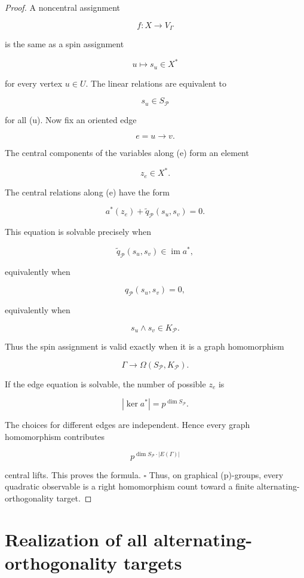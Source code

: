 \documentclass[11pt]{article}
\begin{document}
\begin{proof}
A noncentral assignment

\[
f:X\to V_\Gamma
\]

is the same as a spin assignment

\[
u\mapsto s_u\in X^*
\]

for every vertex $u\in U$. The linear relations are equivalent to

\[
s_u\in S_\mathcal P
\]

for all (u). Now fix an oriented edge

\[
e=u\to v.
\]

The central components of the variables along (e) form an element

\[
z_e\in X^*.
\]

The central relations along (e) have the form

\[
a^*(z_e)+\widetilde q_\mathcal P(s_u,s_v)=0.
\]

This equation is solvable precisely when

\[
\widetilde q_\mathcal P(s_u,s_v)\in\operatorname{im}a^*,
\]

equivalently when

\[
q_\mathcal P(s_u,s_v)=0,
\]

equivalently when

\[
s_u\wedge s_v\in K_\mathcal P.
\]

Thus the spin assignment is valid exactly when it is a graph homomorphism

\[
\Gamma\to\Omega(S_\mathcal P,K_\mathcal P).
\]

If the edge equation is solvable, the number of possible $z_e$ is

\[
|\ker a^*|=p^{\dim S_\mathcal P}.
\]

The choices for different edges are independent. Hence every graph homomorphism contributes

\[
p^{\dim S_\mathcal P\cdot |E(\Gamma)|}
\]

central lifts. This proves the formula. $\square$ Thus, on graphical (p)-groups, every quadratic observable is a right homomorphism count toward a finite alternating-orthogonality target.

\end{proof}

\section{Realization of all alternating-orthogonality targets}
\end{document}
